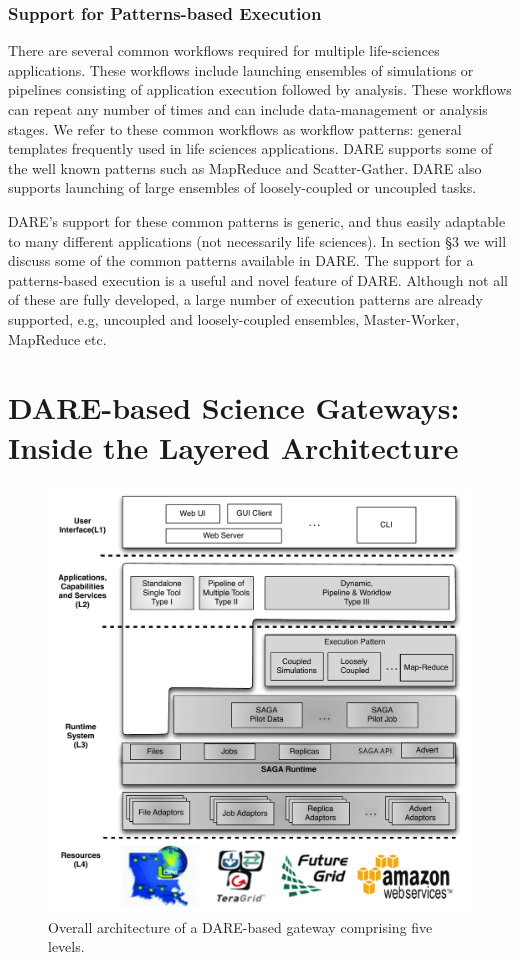 \documentclass[]{svjour3}
\begin{document}
\subsubsection{Support for Patterns-based Execution}

There are several common workflows required for multiple life-sciences
applications. These workflows include launching ensembles of simulations
or pipelines consisting of application execution followed by analysis.
These workflows can repeat any number of times and can include
data-management or analysis stages. We refer to these common workflows
as workflow patterns: general templates frequently used in life sciences
applications. DARE supports some of the well known patterns such as MapReduce
and Scatter-Gather. DARE also supports launching of large ensembles
of loosely-coupled or uncoupled tasks.


DARE's support for these common patterns is generic, and thus easily
adaptable to many different applications (not necessarily life sciences).
In section \S3 we will discuss some of the common patterns available
in DARE. The support for a patterns-based execution is a useful and novel
feature of DARE. Although not all of these are fully developed,
a large number of execution patterns are already supported, e.g,
uncoupled and loosely-coupled ensembles, Master-Worker, MapReduce etc.

\section{DARE-based Science Gateways: Inside the Layered Architecture}

\begin{figure}
 \centering
 \includegraphics[scale=0.55]{figures/DARE-gateway-arch.pdf}
 \caption{\small Overall architecture of a DARE-based gateway
   comprising five levels. }
 \label{fig:dare-arch} 
\end{figure}
\end{document}
